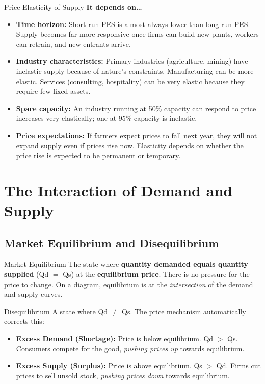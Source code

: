 \documentclass[11pt, a4paper, twoside]{book}
\begin{document}
\begin{evaluation}{Price Elasticity of Supply}
\textbf{It depends on\ldots}
\begin{itemize}[leftmargin=*, nosep]
\item \textbf{Time horizon:} Short-run PES is almost always lower than long-run PES. Supply becomes far more responsive once firms can build new plants, workers can retrain, and new entrants arrive.
\item \textbf{Industry characteristics:} Primary industries (agriculture, mining) have inelastic supply because of nature's constraints. Manufacturing can be more elastic. Services (consulting, hospitality) can be very elastic because they require few fixed assets.
\item \textbf{Spare capacity:} An industry running at 50\% capacity can respond to price increases very elastically; one at 95\% capacity is inelastic.
\item \textbf{Price expectations:} If farmers expect prices to fall next year, they will not expand supply even if prices rise now. Elasticity depends on whether the price rise is expected to be permanent or temporary.
\end{itemize}
\end{evaluation}

\section{The Interaction of Demand and Supply}



\subsection{Market Equilibrium and Disequilibrium}

\begin{keyterm}{Market Equilibrium}
The state where \textbf{quantity demanded equals quantity supplied} (Qd $=$ Qs) at the \textbf{equilibrium price}. There is no pressure for the price to change. On a diagram, equilibrium is at the \emph{intersection} of the demand and supply curves.
\end{keyterm}

\begin{keyterm}{Disequilibrium}
A state where Qd $\neq$ Qs. The price mechanism automatically corrects this:
\begin{itemize}
  \item \textbf{Excess Demand (Shortage):} Price is below equilibrium. Qd $>$ Qs. Consumers compete for the good, \emph{pushing prices up} towards equilibrium.
  \item \textbf{Excess Supply (Surplus):} Price is above equilibrium. Qs $>$ Qd. Firms cut prices to sell unsold stock, \emph{pushing prices down} towards equilibrium.
\end{itemize}
\end{keyterm}
\end{document}
